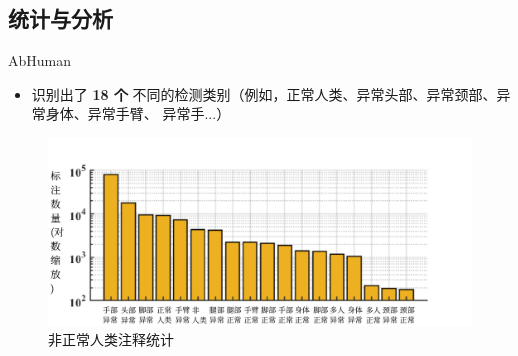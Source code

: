 \documentclass[
    fontset=fandol,
    xcolor=svgnames %
]{ctexbeamer}
\begin{document}
\subsection{统计与分析}
\begin{frame}

    \begin{block}{AbHuman}
        \begin{itemize}
            \item 识别出了\textbf{ 18 个}
不同的检测类别（例如，正常人类、异常头部、异常颈部、异常身体、异常手臂、
异常手...）
        \end{itemize}
    \end{block}
\begin{figure}
    \includegraphics[width=0.95\columnwidth]{fig/Data_Anno1.pdf}
            \caption{非正常人类注释统计}
            \end{figure}
\end{frame}
\end{document}
